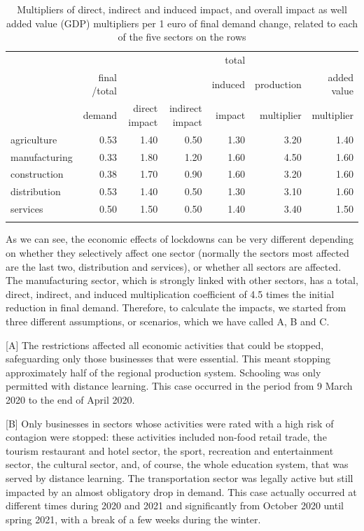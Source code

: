 \documentclass[graybox]{svmult}
\begin{document}
\begin{table}[t]
\centering
\begin{tabular}{lrrrrrr}
\hline\noalign{\smallskip}
& & & & total & \\
& final /total & & & induced & production &  added value \\
& demand & direct impact & indirect impact & impact & multiplier & multiplier \\
\noalign{\smallskip}\svhline\noalign{\smallskip}
agriculture & 0.53	& 1.40 & 0.50 & 1.30	 & 3.20 & 1.40\\
manufacturing & 0.33 & 1.80 & 1.20 & 1.60 & 4.50 & 1.60\\
construction & 0.38 & 1.70 & 0.90 & 1.60 & 3.20 & 1.60\\
distribution & 0.53 & 1.40 & 0.50 & 1.30 & 3.10 & 1.60\\
services & 0.50 & 1.50 & 0.50 & 1.40 & 3.40 & 1.50\\
\hline\noalign{\smallskip}
\end{tabular}
\caption{Multipliers of direct, indirect and induced impact, and overall impact as well added value (GDP) multipliers per 1 euro of final demand change, related to each of the five sectors on the rows}
\label{PiedmontMatrix}
\end{table}

As we can see, the economic effects of lockdowns can be very different depending on whether they selectively affect one sector (normally the sectors most affected are the last two, distribution and services), or whether all sectors are affected. The manufacturing sector, which is strongly linked with other sectors, has a total, direct, indirect, and induced multiplication coefficient of 4.5 times the initial reduction in final demand. Therefore, to calculate the impacts, we started from three different assumptions, or scenarios, which we have called A, B and C.

[A] The restrictions affected all economic activities that could be stopped, safeguarding only those businesses that were essential. This meant stopping approximately half of the regional production system. Schooling was only permitted with distance learning. This case occurred in the period from 9 March 2020 to the end of April 2020.

[B] Only businesses in sectors whose activities were rated with a high risk of contagion were stopped: these activities included non-food retail trade, the tourism restaurant and hotel sector, the sport, recreation and entertainment sector, the cultural sector, and, of course, the whole education system, that was served by distance learning. The transportation sector was legally active but still impacted by an almost obligatory drop in demand. This case actually occurred at different times during 2020 and 2021 and significantly from October 2020 until spring 2021, with a break of a few weeks during the winter.
\end{document}
